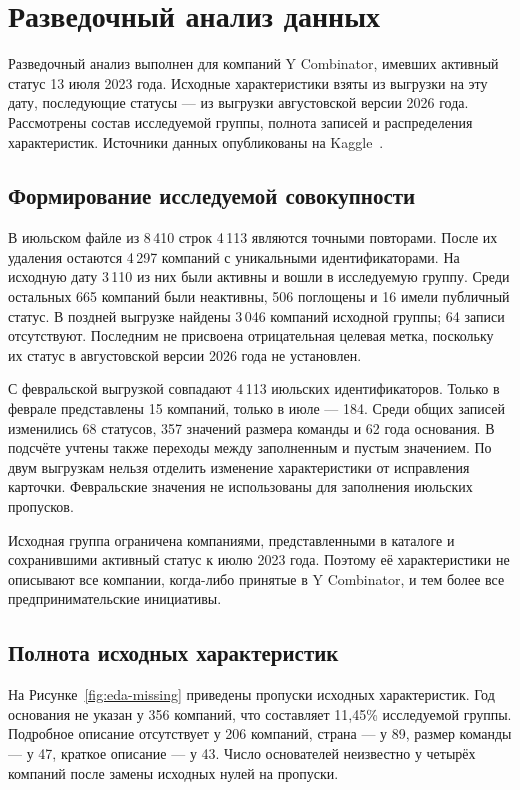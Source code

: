 \clearpage
\section{Разведочный анализ данных}
\label{sec:eda}

Разведочный анализ выполнен для компаний Y Combinator, имевших активный статус 13 июля 2023 года. Исходные характеристики взяты из выгрузки на эту дату, последующие статусы --- из выгрузки августовской версии 2026 года. Рассмотрены состав исследуемой группы, полнота записей и распределения характеристик. Источники данных опубликованы на Kaggle~\cite{kaggle-yc-dataset1,kaggle-yc-dataset2}.

\subsection{Формирование исследуемой совокупности}

В июльском файле из 8\,410 строк 4\,113 являются точными повторами. После их удаления остаются 4\,297 компаний с уникальными идентификаторами. На исходную дату 3\,110 из них были активны и вошли в исследуемую группу. Среди остальных 665 компаний были неактивны, 506 поглощены и 16 имели публичный статус. В поздней выгрузке найдены 3\,046 компаний исходной группы; 64 записи отсутствуют. Последним не присвоена отрицательная целевая метка, поскольку их статус в августовской версии 2026 года не установлен.

С февральской выгрузкой совпадают 4\,113 июльских идентификаторов. Только в феврале представлены 15 компаний, только в июле --- 184. Среди общих записей изменились 68 статусов, 357 значений размера команды и 62 года основания. В подсчёте учтены также переходы между заполненным и пустым значением. По двум выгрузкам нельзя отделить изменение характеристики от исправления карточки. Февральские значения не использованы для заполнения июльских пропусков.

Исходная группа ограничена компаниями, представленными в каталоге и сохранившими активный статус к июлю 2023 года. Поэтому её характеристики не описывают все компании, когда-либо принятые в Y Combinator, и тем более все предпринимательские инициативы.

\subsection{Полнота исходных характеристик}

На Рисунке~\ref{fig:eda-missing} приведены пропуски исходных характеристик. Год основания не указан у 356 компаний, что составляет 11,45\% исследуемой группы. Подробное описание отсутствует у 206 компаний, страна --- у 89, размер команды --- у 47, краткое описание --- у 43. Число основателей неизвестно у четырёх компаний после замены исходных нулей на пропуски.

